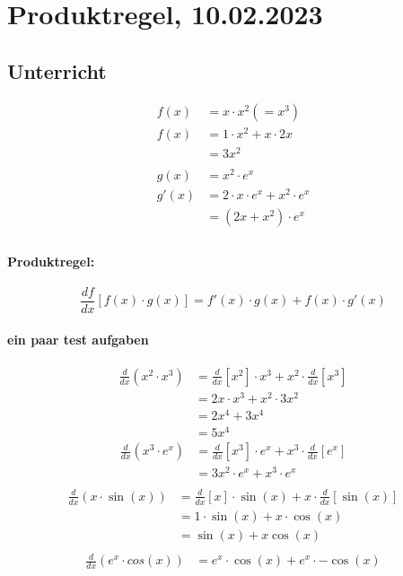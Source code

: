 \documentclass{book}
\begin{document}
\section{Produktregel, 10.02.2023}
\begin{multicols}{2}
\subsection{Unterricht}
\begin{align*}
  f(x)&=x\cdot x^2 (=x^3)\\
  f(x)&=1\cdot x^2+x\cdot 2x\\
  &=3x^2\\
  &\\
  g(x)&=x^2\cdot e^x\\
  g'(x)&=2\cdot x\cdot e^x+x^2\cdot e^x\\
  &=(2x+x^2)\cdot e^x\\
\end{align*}

\paragraph{Produktregel:}
\begin{equation}
  \frac{df}{dx}\left[f(x)\cdot g(x)\right] = f'(x)\cdot g(x)+f(x)\cdot g'(x)
\end{equation}

\paragraph{ein paar test aufgaben} %
\label{par:ein paar test aufgaben}
\begin{align*}
  \frac{d}{dx} (x^2 \cdot  x^3) &= \frac{d}{dx}\left[x^2\right]\cdot x^3+x^2\cdot \frac{d}{dx}\left[x^3\right]\\
                           &= 2x\cdot x^3 + x^2 \cdot 3x^2\\
                           &= 2x^4+3x^4\\
                           &= 5x^4
\end{align*}
\begin{align*}
  \frac{d}{dx} (x^3 \cdot  e^x) &=\frac{d}{dx}\left[x^3\right] \cdot e^x + x^3 \cdot \frac{d}{dx}\left[e^x\right]\\
  &=3x^2 \cdot e^x + x^3 \cdot e^x \\
\end{align*}
\begin{align*}
  \frac{d}{dx} (x \cdot  \sin(x)) &=\frac{d}{dx}\left[x\right]\cdot \sin(x) + x \cdot \frac{d}{dx}\left[\sin(x)\right]\\
  &=1 \cdot \sin(x) + x \cdot \cos(x)\\
  &=\sin(x)+x\cos(x)\\                           
\end{align*}
\begin{align*}
\frac{d}{dx} (e^x \cdot  cos(x)) &=e^x \cdot \cos(x)+ e^x \cdot -\cos(x) \\
\end{align*}


\end{multicols}
\end{document}
